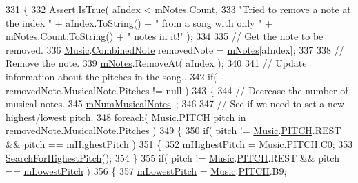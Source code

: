 \begin{DoxyCode}
331     \{
332         Assert.IsTrue( aIndex < \hyperlink{group___song_priv_var_ga674bc904a1f856d485d5fb7fe84bac85}{mNotes}.Count,
333             \textcolor{stringliteral}{"Tried to remove a note at the index "} + aIndex.ToString() + \textcolor{stringliteral}{" from a song with only "} + 
      \hyperlink{group___song_priv_var_ga674bc904a1f856d485d5fb7fe84bac85}{mNotes}.Count.ToString() + \textcolor{stringliteral}{" notes in it!"} );
334 
335         \textcolor{comment}{// Get the note to be removed.}
336         \hyperlink{class_music}{Music}.\hyperlink{group___music_structs_struct_music_1_1_combined_note}{CombinedNote} removedNote = \hyperlink{group___song_priv_var_ga674bc904a1f856d485d5fb7fe84bac85}{mNotes}[aIndex];
337 
338         \textcolor{comment}{// Remove the note.}
339         \hyperlink{group___song_priv_var_ga674bc904a1f856d485d5fb7fe84bac85}{mNotes}.RemoveAt( aIndex );
340 
341         \textcolor{comment}{// Update information about the pitches in the song..}
342         \textcolor{keywordflow}{if}( removedNote.MusicalNote.Pitches != null )
343         \{
344             \textcolor{comment}{// Decrease the number of musical notes.}
345             \hyperlink{group___song_priv_var_gaf55b4fd2df0457ba1306a75ac3fdc8b1}{mNumMusicalNotes}--;
346 
347             \textcolor{comment}{// See if we need to set a new highest/lowest pitch.}
348             \textcolor{keywordflow}{foreach}( \hyperlink{class_music}{Music}.\hyperlink{group___music_enums_ga508f69b199ea518f935486c990edac1d}{PITCH} pitch in removedNote.MusicalNote.Pitches )
349             \{
350                 \textcolor{keywordflow}{if}( pitch != \hyperlink{class_music}{Music}.\hyperlink{group___music_enums_ga508f69b199ea518f935486c990edac1d}{PITCH}.REST && pitch == 
      \hyperlink{group___song_priv_var_ga2dcd39d9add609e9df56a94057441dcc}{mHighestPitch} )
351                 \{
352                     \hyperlink{group___song_priv_var_ga2dcd39d9add609e9df56a94057441dcc}{mHighestPitch} = \hyperlink{class_music}{Music}.\hyperlink{group___music_enums_ga508f69b199ea518f935486c990edac1d}{PITCH}.C0;
353                     \hyperlink{group___song_priv_func_ga5f837e6b7f576732fa38747caa057621}{SearchForHighestPitch}();
354                 \}
355                 \textcolor{keywordflow}{if}( pitch != \hyperlink{class_music}{Music}.\hyperlink{group___music_enums_ga508f69b199ea518f935486c990edac1d}{PITCH}.REST && pitch == \hyperlink{group___song_priv_var_ga293976ef4c2050687a81edfbf77b4fc1}{mLowestPitch} )
356                 \{
357                     \hyperlink{group___song_priv_var_ga293976ef4c2050687a81edfbf77b4fc1}{mLowestPitch} = \hyperlink{class_music}{Music}.\hyperlink{group___music_enums_ga508f69b199ea518f935486c990edac1d}{PITCH}.B9;

\end{DoxyCode}
